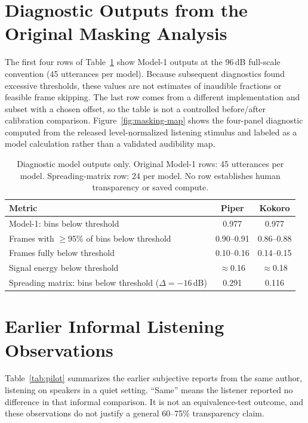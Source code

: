 \documentclass[11pt,a4paper]{article}
\begin{document}
\appendix
\section{Diagnostic Outputs from the Original Masking Analysis}
\label{app:masking}
The first four rows of Table~\ref{tab:h1} show Model-1 outputs at the 96\,dB full-scale convention (45 utterances per model). Because subsequent diagnostics found excessive thresholds, these values are not estimates of inaudible fractions or feasible frame skipping. The last row comes from a different implementation and subset with a chosen offset, so the table is not a controlled before/after calibration comparison. Figure~\ref{fig:masking-map} shows the four-panel diagnostic computed from the released level-normalized listening stimulus and labeled as a model calculation rather than a validated audibility map.


\begin{table}[htbp]
\centering
\caption{Diagnostic model outputs only. Original Model-1 rows: 45 utterances per model. Spreading-matrix row: 24 per model. No row establishes human transparency or saved compute.}
\label{tab:h1}
\small
\begin{tabular}{@{}lcc@{}}
\toprule
\textbf{Metric} & \textbf{Piper} & \textbf{Kokoro} \\
\midrule
Model-1: bins below threshold & 0.977 & 0.977 \\
Frames with $\geq$95\% of bins below threshold & 0.90--0.91 & 0.86--0.88 \\
Frames fully below threshold & 0.10--0.16 & 0.14--0.15 \\
Signal energy below threshold & $\approx$0.16 & $\approx$0.18 \\
Spreading matrix: bins below threshold ($\Delta=-16$\,dB) & 0.291 & 0.116 \\
\bottomrule
\end{tabular}
\end{table}


\section{Earlier Informal Listening Observations}
\label{app:pilot}
Table~\ref{tab:pilot} summarizes the earlier subjective reports from the same author, listening on speakers in a quiet setting. ``Same'' means the listener reported no difference in that informal comparison. It is not an equivalence-test outcome, and these observations do not justify a general 60--75\% transparency claim.
\end{document}
